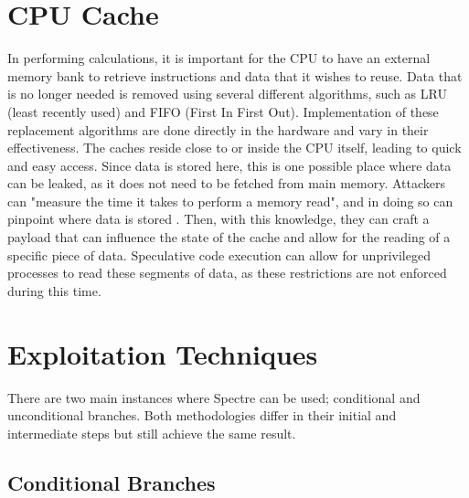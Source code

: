 \documentclass[conference]{IEEEtran}
\begin{document}
\section{CPU Cache}

In performing calculations, it is important for the CPU to have an external memory bank to retrieve instructions and data that it wishes to reuse.
Data that is no longer needed is removed using several different algorithms, such as LRU (least recently used) and FIFO (First In First Out).
Implementation of these replacement algorithms are done directly in the hardware and vary in their effectiveness.
The caches reside close to or inside the CPU itself, leading to quick and easy access.
Since data is stored here, this is one possible place where data can be leaked, as it does not need to be fetched from main memory.
Attackers can "measure the time it takes to perform a memory read", and in doing so can pinpoint where data is stored \autocite[4]{SpectreAttacksExploiting}.
Then, with this knowledge, they can craft a payload that can influence the state of the cache and allow for the reading of a specific piece of data.
Speculative code execution can allow for unprivileged processes to read these segments of data, as these restrictions are not enforced during this time.


\section{Exploitation Techniques}

There are two main instances where Spectre can be used; conditional and unconditional branches.
Both methodologies differ in their initial and intermediate steps but still achieve the same result.

\subsection{Conditional Branches}
\end{document}
